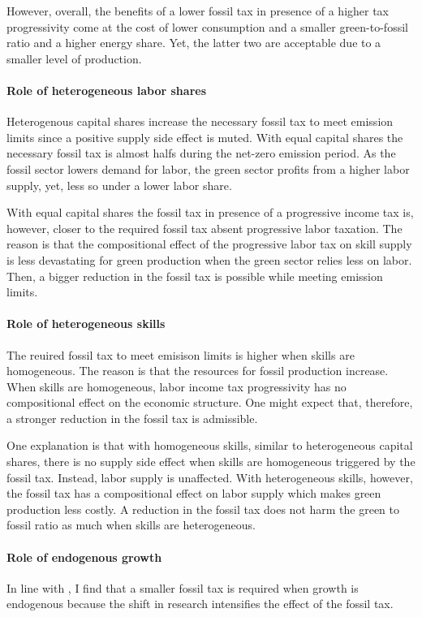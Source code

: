 However, overall, the benefits of a lower fossil tax in presence of a higher tax progressivity come at the cost of lower consumption and a smaller green-to-fossil ratio and a higher energy share. Yet, the latter two are acceptable due to a smaller level of production. 

\paragraph{Role of heterogeneous labor shares}
Heterogenous capital shares increase the necessary fossil tax to meet emission limits since a positive supply side effect is muted. 
With equal capital shares the necessary fossil tax is almost halfs during the net-zero emission period. 
As the fossil sector lowers demand for labor, the green sector profits from a higher labor supply, yet, less so under a lower labor share.  


With equal capital shares the fossil tax in presence of a progressive income tax is, however, closer to the required fossil tax absent progressive labor taxation.  The reason is that the compositional effect of the  progressive labor tax on skill supply is less devastating for green production when the green sector relies less on labor. Then, a bigger reduction in the fossil tax is possible while meeting emission limits. 

\paragraph{Role of heterogeneous skills}

The reuired fossil tax to meet emisison limits is higher when skills are homogeneous. The reason is that the resources for fossil production increase.
When skills are homogeneous, labor income tax progressivity has no compositional effect on the economic structure. One might expect that, therefore, a stronger reduction in the fossil tax is admissible. 

One explanation is that with homogeneous skills, similar to heterogeneous capital shares, there is no supply side effect when skills are homogeneous triggered by the fossil tax. Instead, labor supply is unaffected. With heterogeneous skills, however, the fossil tax has a compositional effect on labor supply which makes green production less costly. A reduction in the fossil tax does not harm the green to fossil ratio as much when skills are heterogeneous. 

\paragraph{Role of endogenous growth}
In line with \cite{Fried2018ClimateAnalysis}, I find that a smaller fossil tax is required when growth is endogenous because the shift in research intensifies the effect of the fossil tax.  
